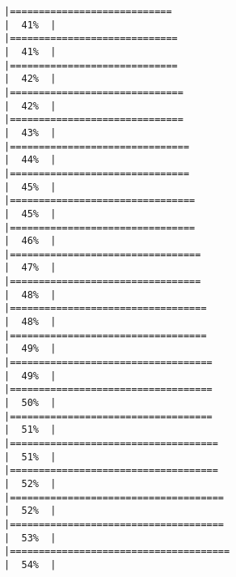 \documentclass[
]{article}
\begin{document}
\begin{verbatim}
|============================                                          |  41%  |                                                                              |=============================                                         |  41%  |                                                                              |=============================                                         |  42%  |                                                                              |==============================                                        |  42%  |                                                                              |==============================                                        |  43%  |                                                                              |===============================                                       |  44%  |                                                                              |===============================                                       |  45%  |                                                                              |================================                                      |  45%  |                                                                              |================================                                      |  46%  |                                                                              |=================================                                     |  47%  |                                                                              |=================================                                     |  48%  |                                                                              |==================================                                    |  48%  |                                                                              |==================================                                    |  49%  |                                                                              |===================================                                   |  49%  |                                                                              |===================================                                   |  50%  |                                                                              |===================================                                   |  51%  |                                                                              |====================================                                  |  51%  |                                                                              |====================================                                  |  52%  |                                                                              |=====================================                                 |  52%  |                                                                              |=====================================                                 |  53%  |                                                                              |======================================                                |  54%  |                                                                              
\end{verbatim}
\end{document}
